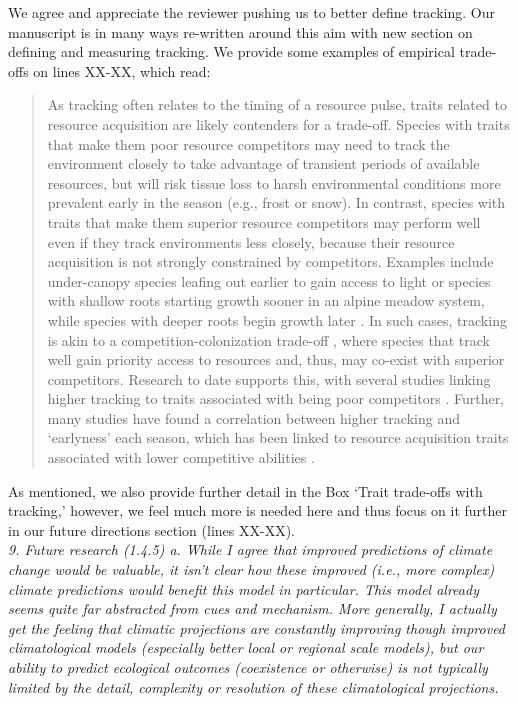 \documentclass[11pt]{article}
\begin{document}
We agree and appreciate the reviewer pushing us to better define tracking. Our manuscript is in many ways re-written around this aim with new section on defining and measuring tracking. We provide some examples of empirical trade-offs on lines XX-XX, which read:
\begin{quote}
As tracking often relates to the timing of a resource pulse, traits related to resource acquisition are likely contenders for a trade-off. Species with traits that make them poor resource competitors may need to track the environment closely to take advantage of transient periods of available resources, but will risk tissue loss to harsh environmental conditions more prevalent early in the season (e.g., frost or snow). In contrast, species with traits that make them superior resource competitors may perform well even if they track environments less closely, because their resource acquisition is not strongly constrained by competitors. Examples include under-canopy species leafing out earlier to gain access to light \citep{heberling2019} or species with shallow roots starting growth sooner in an alpine meadow system, while species with deeper roots begin growth later \citep{Zhu2016BioLetters}. In such cases, tracking is akin to a competition-colonization trade-off \citep{Amarasekare:2003tq}, where species that track well gain priority access to resources and, thus, may co-exist with superior competitors. Research to date supports this, with several studies linking higher tracking to traits associated with being poor competitors \citep{Dorji2013,lasky2016,Zhu2016BioLetters}. Further, many studies have found a correlation between higher tracking and `earlyness' each season, which has been linked to resource acquisition traits associated with lower competitive abilities \citep[][see Box `Trait trade-offs with tracking']{wolkovich2014aob}. 
\end{quote}
As mentioned, we also provide further detail in the Box `Trait trade-offs with tracking,' however, we feel much more is needed here and thus focus on it further in our future directions section (lines XX-XX). \\

\emph{9.      Future research (1.4.5)
a.      While I agree that improved predictions of climate change would be valuable, it isn’t
clear how these improved (i.e., more complex) climate predictions would benefit this model in
particular. This model already seems quite far abstracted from cues and mechanism. More
generally, I actually get the feeling that climatic projections are constantly improving
though improved climatological models (especially better local or regional scale models), but
our ability to predict ecological outcomes (coexistence or otherwise) is not typically
limited by the detail, complexity or resolution of these climatological projections.}\\
\end{document}
